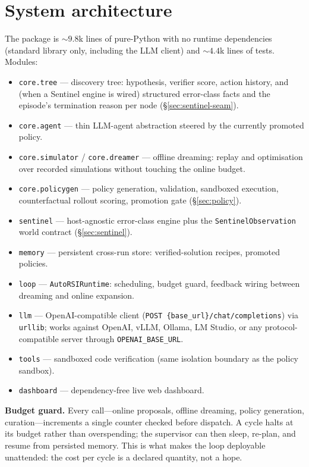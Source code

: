 \documentclass[11pt,a4paper]{article}
\newcommand{\hdr}[1]{\textbf{#1}}
\begin{document}
\section{System architecture}

The package is ${\sim}9.8$k lines of pure-Python with no runtime dependencies
(standard library only, including the LLM client) and ${\sim}4.4$k lines of tests.
Modules:

\begin{itemize}
  \item \texttt{core.tree} --- discovery tree: hypothesis, verifier score,
  action history, and (when a Sentinel engine is wired) structured
  error-class facts and the episode's termination reason per node
  (\S\ref{sec:sentinel-seam}).
  \item \texttt{core.agent} --- thin LLM-agent abstraction steered by the
  currently promoted policy.
  \item \texttt{core.simulator} / \texttt{core.dreamer} --- offline dreaming:
  replay and optimisation over recorded simulations without touching the
  online budget.
  \item \texttt{core.policygen} --- policy generation, validation, sandboxed
  execution, counterfactual rollout scoring, promotion gate
  (\S\ref{sec:policy}).
  \item \texttt{sentinel} --- host-agnostic error-class engine plus the
  \texttt{SentinelObservation} world contract (\S\ref{sec:sentinel}).
  \item \texttt{memory} --- persistent cross-run store: verified-solution
  recipes, promoted policies.
  \item \texttt{loop} --- \texttt{AutoRSIRuntime}: scheduling, budget guard,
  feedback wiring between dreaming and online expansion.
  \item \texttt{llm} --- OpenAI-compatible client
  (\texttt{POST \{base\_url\}/chat/completions}) via \texttt{urllib}; works
  against OpenAI, vLLM, Ollama, LM Studio, or any protocol-compatible server
  through \texttt{OPENAI\_BASE\_URL}.
  \item \texttt{tools} --- sandboxed code verification (same isolation
  boundary as the policy sandbox).
  \item \texttt{dashboard} --- dependency-free live web dashboard.
\end{itemize}

\hdr{Budget guard.} Every call---online proposals, offline dreaming, policy
generation, curation---increments a single counter checked before dispatch.
A cycle halts at its budget rather than overspending; the supervisor can then
sleep, re-plan, and resume from persisted memory. This is what makes the loop
deployable unattended: the cost per cycle is a declared quantity, not a hope.
\end{document}
